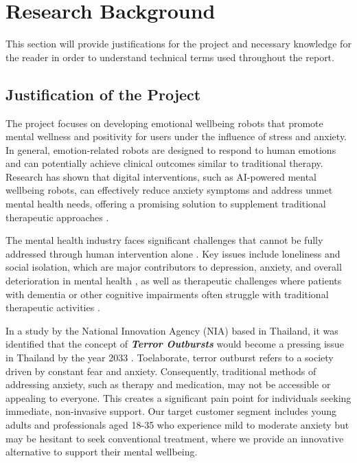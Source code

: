 \section{Research Background}
This section will provide justifications for the project and necessary knowledge for the reader in order to
understand technical terms used throughout the report.

\subsection{Justification of the Project}

The project focuses on developing emotional wellbeing robots that promote mental wellness and positivity for users under the influence of stress and anxiety. In general, emotion-related robots are designed to respond to human emotions and can potentially achieve clinical outcomes similar to traditional therapy\cite{Palmer2024.07.17.24310551}. Research has shown that digital interventions, such as AI-powered mental wellbeing robots, can effectively reduce anxiety symptoms and address unmet mental health needs, offering a promising solution to supplement traditional therapeutic approaches \cite{jarvis2024companion}.

The mental health industry faces significant challenges that cannot be fully addressed through human intervention alone \cite{charles-2024}. Key issues include loneliness and social isolation, which are major contributors to depression, anxiety, and overall deterioration in mental health \cite{GOH202372}, as well as therapeutic challenges where patients with dementia or other cognitive impairments often struggle with traditional therapeutic activities \cite{Sukhawathanakul_Crizzle_Tuokko_Naglie_Rapoport_2021}.

In a study by the National Innovation Agency (NIA) based in Thailand, it was identified that the concept of \textbf{\textit{Terror Outbursts}} would become a pressing issue in Thailand by the year 2033 \cite{nia2023}. Toelaborate, terror outburst refers to a society driven by constant fear and anxiety. Consequently, traditional methods of addressing anxiety, such as therapy and medication, may not be accessible or appealing to everyone. This creates a significant pain point for individuals seeking immediate, non-invasive support. Our target customer segment includes young adults and professionals aged 18-35 who experience mild to moderate anxiety but may be hesitant to seek conventional treatment, where we provide an innovative alternative to support their mental wellbeing.

